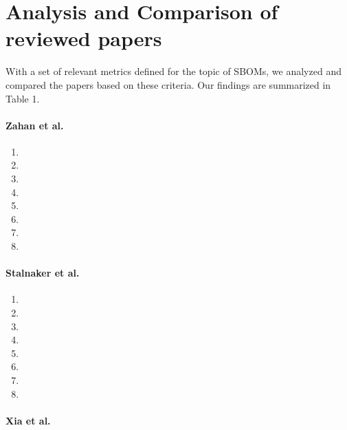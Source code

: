 \section{Analysis and Comparison of reviewed papers} \label{analysis}

\noindent With a set of relevant metrics defined for the topic of SBOMs, we analyzed and compared the papers based on these criteria. Our findings are summarized in Table 1.

\paragraph{Zahan et al. \cite{article:sbom-required}}

\begin{enumerate}
    \item
    \item
    \item
    \item
    \item
    \item
    \item
    \item
\end{enumerate}

\paragraph{Stalnaker et al. \cite{article:software-bom}}

\begin{enumerate}
    \item
    \item
    \item
    \item
    \item
    \item
    \item
    \item
\end{enumerate}

\paragraph{Xia et al. \cite{article:sbom-study}}

